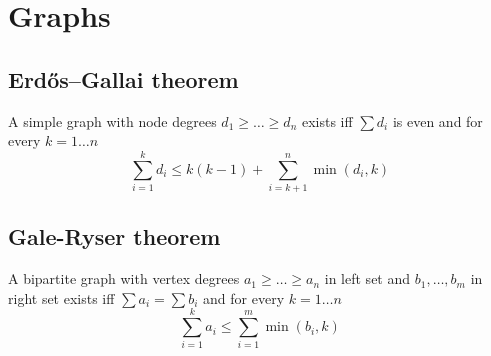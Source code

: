 \chapter{Graphs}
\section{Erdős–Gallai theorem}
A simple graph with node degrees $d_1 \ge \ldots \ge d_n$ exists iff $\sum d_i$ is even and for every $k = 1 \ldots n$
$$\sum_{i = 1}^{k} d_i \le k(k - 1) + \sum_{i = k + 1}^{n} \min(d_i, k)$$

\section{Gale-Ryser theorem}
A bipartite graph with vertex degrees $a_1 \ge \ldots \ge a_n$ in left set and $b_{1},\ldots ,b_{m}$ in right set exists iff $\sum a_i = \sum b_i$ and for every $k = 1 \ldots n$
$$\sum_{i = 1}^{k} a_i \le \sum_{i = 1}^{m} \min(b_i, k)$$

